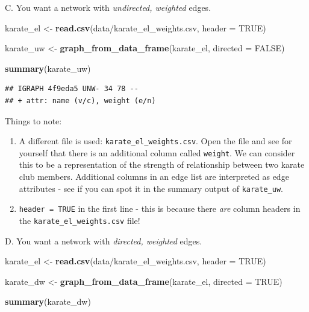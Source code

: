 \documentclass[
]{book}
\newenvironment{Shaded}{\begin{snugshade}}{\end{snugshade}}
\newcommand{\AttributeTok}[1]{\textcolor[rgb]{0.13,0.29,0.53}{#1}}
\newcommand{\ConstantTok}[1]{\textcolor[rgb]{0.56,0.35,0.01}{#1}}
\newcommand{\FunctionTok}[1]{\textcolor[rgb]{0.13,0.29,0.53}{\textbf{#1}}}
\newcommand{\NormalTok}[1]{#1}
\newcommand{\OtherTok}[1]{\textcolor[rgb]{0.56,0.35,0.01}{#1}}
\newcommand{\StringTok}[1]{\textcolor[rgb]{0.31,0.60,0.02}{#1}}
\providecommand{\tightlist}{%
  \setlength{\itemsep}{0pt}\setlength{\parskip}{0pt}}
\begin{document}
C. You want a network with \emph{undirected, weighted} edges.

\begin{Shaded}
\begin{Highlighting}[]
\NormalTok{karate\_el }\OtherTok{\textless{}{-}} \FunctionTok{read.csv}\NormalTok{(}\StringTok{\textquotesingle{}data/karate\_el\_weights.csv\textquotesingle{}}\NormalTok{, }\AttributeTok{header =} \ConstantTok{TRUE}\NormalTok{)}

\NormalTok{karate\_uw }\OtherTok{\textless{}{-}} \FunctionTok{graph\_from\_data\_frame}\NormalTok{(karate\_el, }\AttributeTok{directed =} \ConstantTok{FALSE}\NormalTok{)}

\FunctionTok{summary}\NormalTok{(karate\_uw)}
\end{Highlighting}
\end{Shaded}

\begin{verbatim}
## IGRAPH 4f9eda5 UNW- 34 78 -- 
## + attr: name (v/c), weight (e/n)
\end{verbatim}

Things to note:

\begin{enumerate}
\def\labelenumi{\arabic{enumi}.}
\tightlist
\item
  A different file is used: \texttt{karate\_el\_weights.csv}. Open the file and see for yourself that there is an additional column called \texttt{weight}. We can consider this to be a representation of the strength of relationship between two karate club members. Additional columns in an edge list are interpreted as edge attributes - see if you can spot it in the summary output of \texttt{karate\_uw}.
\item
  \texttt{header\ =\ TRUE} in the first line - this is because there \emph{are} column headers in the \texttt{karate\_el\_weights.csv} file!
\end{enumerate}

D. You want a network with \emph{directed, weighted} edges.

\begin{Shaded}
\begin{Highlighting}[]
\NormalTok{karate\_el }\OtherTok{\textless{}{-}} \FunctionTok{read.csv}\NormalTok{(}\StringTok{\textquotesingle{}data/karate\_el\_weights.csv\textquotesingle{}}\NormalTok{, }\AttributeTok{header =} \ConstantTok{TRUE}\NormalTok{)}

\NormalTok{karate\_dw }\OtherTok{\textless{}{-}} \FunctionTok{graph\_from\_data\_frame}\NormalTok{(karate\_el, }\AttributeTok{directed =} \ConstantTok{TRUE}\NormalTok{)}

\FunctionTok{summary}\NormalTok{(karate\_dw)}
\end{Highlighting}
\end{Shaded}
\end{document}
